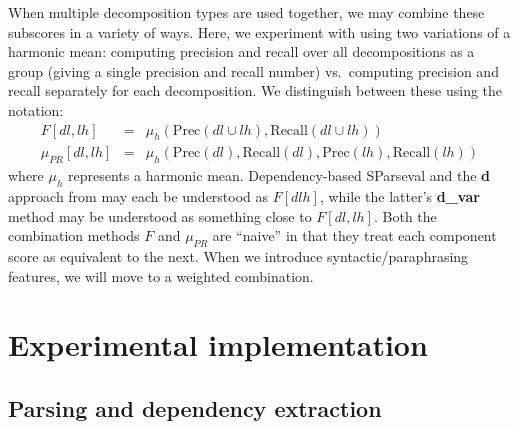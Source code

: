 \documentclass{kluwer}    %
\newcommand{\precision}[1]{\ensuremath{\textrm{Prec}\left(#1\right)}}
\newcommand{\recall}[1]{\ensuremath{\textrm{Recall}\left(#1\right)}}
\begin{document}
\begin{article}


When multiple decomposition types are used together, we may combine
these subscores in a variety of ways. Here, we experiment with using
two variations of a harmonic mean:
computing precision and recall over all
decompositions as a group (giving a single precision and recall number)
vs.\ computing precision and recall separately for each decomposition.
We distinguish between these using the notation:
\begin{eqnarray}
  \label{eq:fprmeans}
  F[dl,lh] & = &
  \mu_h \left( \precision{dl \cup lh},
    \recall{dl \cup lh} \right) \\
  \mu_{PR}[dl,lh]  & = & \mu_h \left( \precision{dl},
    \recall{dl}, \precision{lh}, \recall{lh} \right)    
\end{eqnarray}
where $\mu_h$ represents a harmonic mean.
Dependency-based SParseval  
and the \textbf{d} approach from
 may each be understood as
$F[dlh]$, while the latter's \textbf{d\_var} method may be understood
as something close to $F[dl,lh]$.
%
Both the combination methods $F$ and
$\mu_{PR}$ are ``naive'' in that they treat each component
score as equivalent to the next.  When we introduce syntactic/paraphrasing
features, we will move to a weighted combination.



\section{Experimental implementation}
\label{sec:paradigm}

\subsection{Parsing and dependency extraction}


\end{article}
\end{document}
